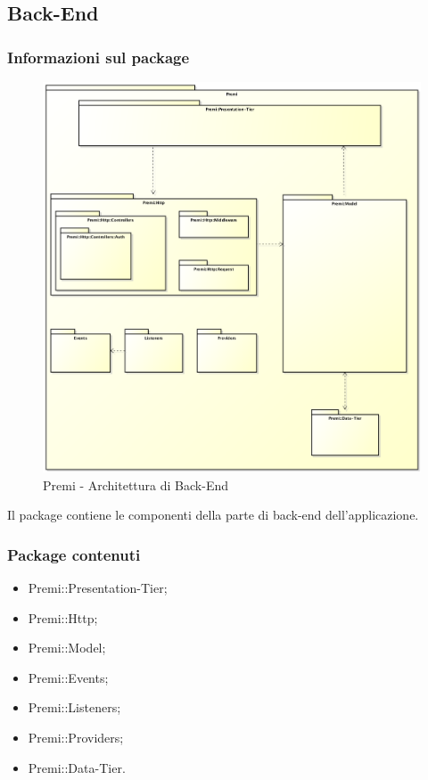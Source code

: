 \subsection{Back-End}
	\subsubsection*{Informazioni sul package}
		\begin{figure}[h]
			\centering
			\includegraphics[width=0.9\linewidth]{img/back-end_package}
			\caption[Premi::Back-End]{Premi - Architettura di Back-End}
		\end{figure}
		Il package contiene le componenti della parte di \gls{back-end} dell'applicazione.
		
	\subsubsection*{Package contenuti}
		\begin{itemize}
			\item Premi::Presentation-Tier;
			\item Premi::Http;
			\item Premi::Model;
			\item Premi::Events;
			\item Premi::Listeners;
			\item Premi::Providers;
			\item Premi::Data-Tier.
		\end{itemize}

